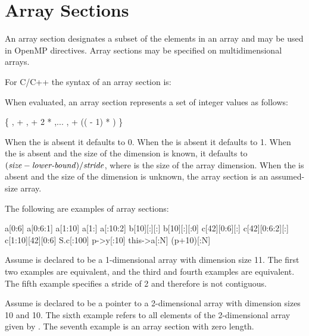 \section{Array Sections}
\label{sec:array_sections_syntax}

An array section designates a subset of the elements in an array
and may be used in OpenMP directives.
Array sections may be specified on multidimensional arrays.

\begin{ccppspecific}
For C/C++ the syntax of an array section is:

\begin{indentedcodelist}
\end{indentedcodelist}

When evaluated, an array section represents a set of integer values
as follows:

\{ ,  + ,  + 2 * ,... ,  + (( - 1) * ) \}

When the  is absent it defaults to 0.
When the  is absent it defaults to 1.
When the  is absent and the size of the dimension is known, it
defaults to $(\textrm{\textmd{\itshape{size}}} - \textrm{\textmd{\itshape{lower-bound}}})/\textrm{\textmd{\itshape{stride}}}$,
where  is the size of the array dimension.
When the  is absent and the size of the dimension is unknown, 
the array section is an assumed-size array.

The following are examples of array sections:

\begin{boxedcode}
a[0:6]
a[0:6:1]
a[1:10]
a[1:]
a[:10:2]
b[10][:][:]
b[10][:][:0]
c[42][0:6][:]
c[42][0:6:2][:]
c[1:10][42][0:6]
S.c[:100]
p->y[:10]
this->a[:N]
(p+10)[:N]
\end{boxedcode}

Assume  is declared to be a 1-dimensional array with dimension
size 11. The first two examples are equivalent, and the third and fourth
examples are equivalent. The fifth example specifies a stride of 2 and
therefore is not contiguous.

Assume  is declared to be a pointer to a 2-dimensional array with
dimension sizes 10 and 10. The sixth example refers to all elements of the
2-dimensional array given by . The seventh example is an
array section with zero length.


\end{ccppspecific}
